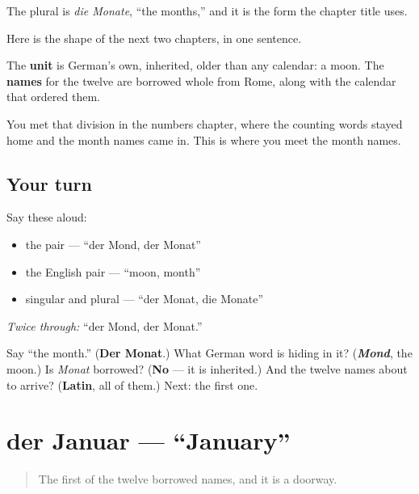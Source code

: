 The plural is \emph{die Monate}, \textquotedblleft{}the months,\textquotedblright{} and it is the form the chapter title uses.

\begin{culture}
Here is the shape of the next two chapters, in one sentence.

The \textbf{unit} is German's own, inherited, older than any calendar: a moon. The \textbf{names} for the twelve are borrowed whole from Rome, along with the calendar that ordered them.

You met that division in the numbers chapter, where the counting words stayed home and the month names came in. This is where you meet the month names.
\end{culture}

\subsection*{Your turn}
Say these aloud:

\begin{itemize}
\raggedright
  \item the pair — \textquotedblleft{}der Mond, der Monat\textquotedblright{}
  \item the English pair — \textquotedblleft{}moon, month\textquotedblright{}
  \item singular and plural — \textquotedblleft{}der Monat, die Monate\textquotedblright{}
\end{itemize}

\emph{Twice through:} \textquotedblleft{}der Mond, der Monat.\textquotedblright{}

\begin{tcolorbox}[breakable,colback=teal!4,colframe=teal!35!black,title={Before you move on}]
Say \textquotedblleft{}the month.\textquotedblright{} (\textbf{Der Monat}.) What German word is hiding in it? (\emph{\textbf{Mond}}, the moon.) Is \emph{Monat} borrowed? (\textbf{No} — it is inherited.) And the twelve names about to arrive? (\textbf{Latin}, all of them.) Next: the first one.
\end{tcolorbox}
\section[der Januar]{der Januar — \textquotedblleft{}January\textquotedblright{}}

\label{lesson:GE-C09-januar}



\begin{quote}
The first of the twelve borrowed names, and it is a doorway.
\end{quote}


